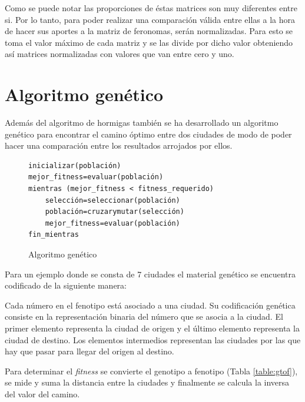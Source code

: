 \documentclass[conference,a4paper,10pt,oneside,final]{tfmpd}
\begin{document}
Como se puede notar las proporciones de éstas matrices son muy diferentes entre si. Por lo tanto, para poder realizar una comparación válida entre ellas a la hora de hacer sus aportes a la matriz de feronomas, serán normalizadas. Para esto se toma el valor máximo de cada matriz y se las divide por dicho valor obteniendo así matrices normalizadas con valores que van entre cero y uno.

\section{Algoritmo genético}

Además del algoritmo de hormigas también se ha desarrollado un algoritmo genético para encontrar el camino óptimo entre dos ciudades de modo de poder hacer una comparación entre los resultados arrojados por ellos.

\begin{figure}[!h]
\begin{lstlisting}[mathescape=true]
inicializar(población)
mejor_fitness=evaluar(población)
mientras (mejor_fitness < fitness_requerido)
	selección=seleccionar(población)
	población=cruzarymutar(selección)
	mejor_fitness=evaluar(población)
fin_mientras
\end{lstlisting}
\caption{Algoritmo genético}
\label{fig:AG}
\end{figure}

Para un ejemplo donde se consta de 7 ciudades el material genético se encuentra codificado de la siguiente manera:

\begin{center}
\end{center}

Cada número en el fenotipo está asociado a una ciudad. Su codificación genética consiste en la representación binaria del número que se asocia a la ciudad. El primer elemento representa la ciudad de origen y el último elemento representa la ciudad de destino. Los elementos intermedios representan las ciudades por las que hay que pasar para llegar del origen al destino.

Para determinar el \textit{fitness} se convierte el genotipo a fenotipo (Tabla \ref{table:gtof}), se mide y suma la distancia entre la ciudades y finalmente se calcula la inversa del valor del camino.
\end{document}
